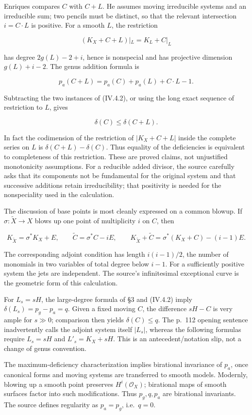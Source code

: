Enriques compares \(C\) with \(C+L\). He assumes moving irreducible systems and an irreducible sum; two pencils must be distinct, so that the relevant intersection \(i=C\cdot L\) is positive. For a smooth \(L\), the restriction

\[
 (K_X+C+L)|_L=K_L+C|_L
\]

has degree \(2g(L)-2+i\), hence is nonspecial and has projective dimension \(g(L)+i-2\). The genus addition formula is

\[
 p_a(C+L)=p_a(C)+p_a(L)+C\cdot L-1.
\]

Subtracting the two instances of (IV.4.2), or using the long exact sequence of restriction to \(L\), gives

\[
 \delta(C)\leq\delta(C+L).
\]

In fact the codimension of the restriction of \(|K_X+C+L|\) inside the complete series on \(L\) is \(\delta(C+L)-\delta(C)\). Thus equality of the deficiencies is equivalent to completeness of this restriction. These are proved claims, not unjustified monotonicity assumptions. For a reducible added divisor, the source carefully asks that its components not be fundamental for the original system and that successive additions retain irreducibility; that positivity is needed for the nonspeciality used in the calculation.

The discussion of base points is most cleanly expressed on a common blowup. If \(\sigma:\widetilde X\to X\) blows up one point of multiplicity \(i\) on \(C\), then

\[
 K_{\widetilde X}=\sigma^*K_X+E,
 \qquad\widetilde C=\sigma^*C-iE,
 \qquad K_{\widetilde X}+\widetilde C
 =\sigma^*(K_X+C)-(i-1)E.
\]

The corresponding adjoint condition has length \(i(i-1)/2\), the number of monomials in two variables of total degree below \(i-1\). For a sufficiently positive system the jets are independent. The source's infinitesimal exceptional curve is the geometric form of this calculation.

For \(L_s=sH\), the large-degree formula of §3 and (IV.4.2) imply \(\delta(L_s)=p_g-p_a=q\). Given a fixed moving \(C\), the difference \(sH-C\) is very ample for \(s\gg0\); comparison then yields \(\delta(C)\leq q\). The p.~112 opening sentence inadvertently calls the adjoint system itself \(|L_s|\), whereas the following formulas require \(L_s=sH\) and \(L'_s=K_X+sH\). This is an antecedent/notation slip, not a change of genus convention.

The maximum-deficiency characterization implies birational invariance of \(p_a\), once canonical forms and moving systems are transferred to smooth models. Modernly, blowing up a smooth point preserves \(H^i(\mathcal O_X)\); birational maps of smooth surfaces factor into such modifications. Thus \(p_g,q,p_a\) are birational invariants. The source defines regularity as \(p_a=p_g\), i.e.~\(q=0\).

